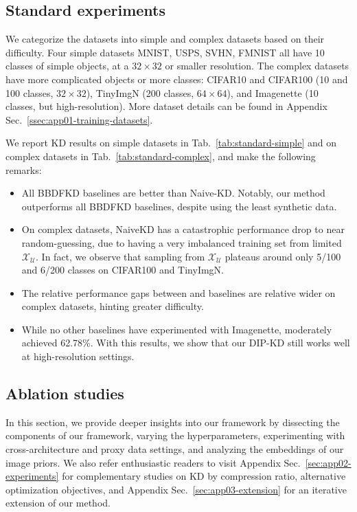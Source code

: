 \subsection{Standard experiments} \label{ssec:04-experiments-standard}
\begin{foldable} %
    We categorize the datasets into simple and complex datasets based on their difficulty.
    Four simple datasets MNIST, USPS, SVHN, FMNIST all have 10 classes of simple objects, at a $32\times32$ or smaller resolution.
    The complex datasets have more complicated objects or more classes: CIFAR10 and CIFAR100 (10 and 100 classes, $32\times32$), TinyImgN (200 classes, $64\times64$), and Imagenette (10 classes, but high-resolution).
    More dataset details can be found in Appendix Sec.~\ref{ssec:app01-training-datasets}.
\end{foldable}

\begin{foldable}
    We report KD results on simple datasets in Tab.~\ref{tab:standard-simple} and on complex datasets in Tab.~\ref{tab:standard-complex}, and make the following remarks:
    \begin{itemize}
        \item All BBDFKD baselines are better than Naive-KD.
            Notably, our method {\methodname} outperforms all BBDFKD baselines, despite using the least synthetic data.
        \item On complex datasets, NaiveKD has a catastrophic performance drop to near random-guessing, due to having a very imbalanced training set from limited $\mathcal{X}_{\mathcal{U}}$. In fact, we observe that sampling from $\mathcal{X}_{\mathcal{U}}$ plateaus around only 5/100 and 6/200 classes on CIFAR100 and TinyImgN. 
        \item The relative performance gaps between {\methodname} and baselines are relative wider on complex datasets, hinting greater difficulty.
        \item While no other baselines have experimented with Imagenette, {\methodname} moderately achieved 62.78\%.
            With this results, we show that our DIP-KD still works well at high-resolution settings.
    \end{itemize}
\end{foldable}


\subsection{Ablation studies} \label{ssec:04-experiments-ablation}
\begin{foldable}
    In this section, we provide deeper insights into our framework by dissecting the components of our framework, varying the hyperparameters, experimenting with cross-architecture and proxy data settings, and analyzing the embeddings of our image priors.
    We also refer enthusiastic readers to visit Appendix Sec.~\ref{sec:app02-experiments} for complementary studies on KD by compression ratio, alternative optimization objectives, and Appendix Sec.~\ref{sec:app03-extension} for an iterative extension of our method.
\end{foldable}


